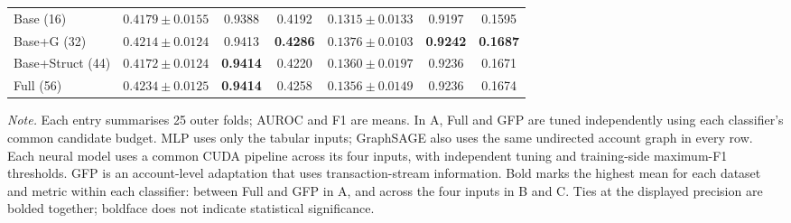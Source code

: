 \begin{table}[htbp]
\begin{threeparttable}
\begin{tabular}{lcccccc}
Base (16) & $0.4179 \pm 0.0155$ & 0.9388 & 0.4192 & $0.1315 \pm 0.0133$ & 0.9197 & 0.1595 \\
Base+G (32) & $0.4214 \pm 0.0124$ & 0.9413 & \textbf{0.4286} & $\mathbf{0.1376} \pm 0.0103$ & \textbf{0.9242} & \textbf{0.1687} \\
Base+Struct (44) & $0.4172 \pm 0.0124$ & \textbf{0.9414} & 0.4220 & $0.1360 \pm 0.0197$ & 0.9236 & 0.1671 \\
Full (56) & $\mathbf{0.4234} \pm 0.0125$ & \textbf{0.9414} & 0.4258 & $0.1356 \pm 0.0149$ & 0.9236 & 0.1674 \\
\bottomrule
\end{tabular}
\begin{tablenotes}[flushleft]
\footnotesize
\setlength{\labelsep}{0pt}\item[] \textit{Note.} Each entry summarises 25 outer folds; AUROC and F1 are means. In A, Full and GFP are tuned independently using each classifier's common candidate budget. MLP uses only the tabular inputs; GraphSAGE also uses the same undirected account graph in every row. Each neural model uses a common CUDA pipeline across its four inputs, with independent tuning and training-side maximum-F1 thresholds. GFP is an account-level adaptation that uses transaction-stream information. Bold marks the highest mean for each dataset and metric within each classifier: between Full and GFP in A, and across the four inputs in B and C. Ties at the displayed precision are bolded together; boldface does not indicate statistical significance.
\end{tablenotes}
\end{threeparttable}
\end{table}
